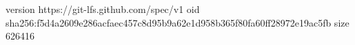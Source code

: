 version https://git-lfs.github.com/spec/v1
oid sha256:f5d4a2609e286acfaec457c8d95b9a62e1d958b365f80fa60ff28972e19ac5fb
size 626416
